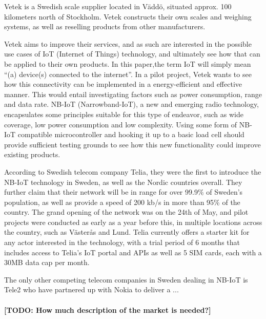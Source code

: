 
Vetek is a Swedish scale supplier located in Väddö, situated approx. 100 kilometers north of Stockholm. Vetek constructs their own scales and weighing systems, as well as reselling products from other manufacturers.\cite{vetek} 

Vetek aims to improve their services, and as such are interested in the possible use cases of IoT (Internet of Things) technology, and ultimately see how that can be applied to their own products. In this paper,the term IoT will simply mean ``(a) device(s) connected to the internet''\cite{what_is_iot}. In a pilot project, Vetek wants to see how this connectivity can be implemented in a energy-efficient and effective manner. This would entail investigating factors such as power consumption, range and data rate. NB-IoT (Narrowband-IoT), a new and emerging radio technology, encapsulates some principles suitable for this type of endeavor, such as wide coverage, low power consumption and low complexity.\cite{NB-overview} Using some form of NB-IoT compatible microcontroller and hooking it up to a basic load cell should provide sufficient testing grounds to see how this new functionality could improve existing products.

According to Swedish telecom company Telia, they were the first to introduce the NB-IoT technology in Sweden, as well as the Nordic countries overall\cite{telia-nb}. They further claim that their network will be in range for over 99.9\% of Sweden's population, as well as provide a speed of 200 kb/s in more than 95\% of the country.\cite{telia-first} The grand opening of the network was on the 24th of May, and pilot projects were conducted as early as a year before this, in multiple locations across the country, such as Västerås and Lund. Telia currently offers a starter kit  for any actor interested in the technology, with a trial period of 6 months that includes access to Telia's IoT portal and APIs as well as 5 SIM cards, each with a 30MB data cap per month. 

The only other competing telecom companies in Sweden dealing in NB-IoT is Tele2  who have partnered up with Nokia to deliver a ... 
\\\\
\textbf{[TODO: How much description of the market is needed?]}
\\\\

